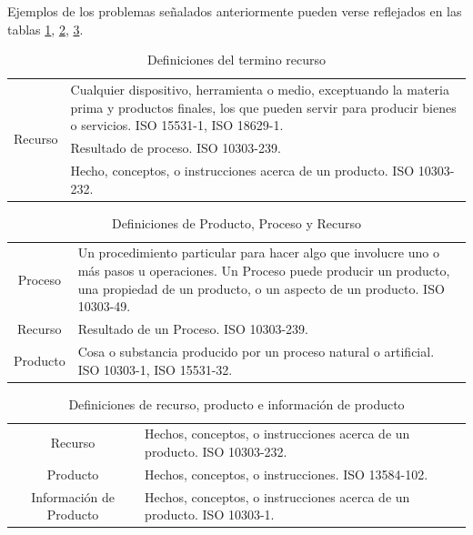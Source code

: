 \documentclass[journal]{IEEEtran}
\begin{document}
Ejemplos de los problemas se\~{n}alados anteriormente pueden verse reflejados en las tablas \ref{tabla1}, \ref{tabla2}, \ref{tabla3}. 

\begin{table}[!t]
\renewcommand{\arraystretch}{1.3}
\caption{Definiciones del termino recurso}
\label{tabla1}
\centering
\begin{tabular}{|c|p{6cm}|}
\hline
\multirow{3}{*}{Recurso} & Cualquier dispositivo, herramienta o medio, exceptuando la materia prima y productos finales, los que pueden servir para producir bienes o servicios. ISO 15531-1, ISO 18629-1.\\ \cline{2-2}
                         & Resultado de proceso. ISO 10303-239.\\ \cline{2-2}
                         & Hecho, conceptos, o instrucciones acerca de un producto. ISO 10303-232. \\  \hline                                                                                                     
\end{tabular}
\end{table}

\begin{table}[!t]
\renewcommand{\arraystretch}{1.3}
\caption{Definiciones de Producto, Proceso y Recurso}
\label{tabla2}
\centering
\begin{tabular}{|c|p{6cm}|}
\hline
Proceso & Un procedimiento particular para hacer algo que involucre uno o m\'as pasos u operaciones. Un Proceso puede producir un producto, una propiedad de un producto, o un aspecto de un producto. ISO 10303-49.\\ \cline{1-2}
Recurso                         & Resultado de un Proceso. ISO 10303-239.\\ \cline{1-2}
Producto                         & Cosa o substancia producido por un proceso natural o artificial. ISO 10303-1, ISO 15531-32. \\  \hline                                                                                                     
\end{tabular}
\end{table}

\begin{table}[!t]
\renewcommand{\arraystretch}{1.3}
\caption{Definiciones de recurso, producto e informaci\'on de producto}
\label{tabla3}
\centering
\begin{tabular}{|c|p{4cm}|}
\hline
Recurso & Hechos, conceptos, o instrucciones acerca de un producto. ISO 10303-232.\\ \cline{1-2}
Producto & Hechos, conceptos, o instrucciones. ISO 13584-102.\\ \cline{1-2}
Informaci\'on de Producto & Hechos, conceptos, o instrucciones acerca de un producto. ISO 10303-1. \\  \hline                                                                                                     
\end{tabular}
\end{table}
\end{document}
